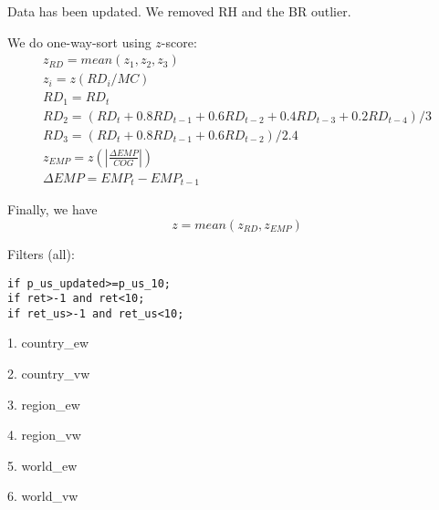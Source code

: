 

\usepackage[T1]{fontenc}




\thispagestyle{fancy}

\newcommand{\code}{\texttt}
\newcommand*{\Commonpath}{20190110/RD-COG}


Data has been updated. We removed RH and the BR outlier.



We do one-way-sort using $z$-score:
$$
\begin{aligned}
& z_{RD} = mean(z_1, z_2, z_3) \\
& z_i = z(RD_i/MC) \\
& RD_1 = RD_t \\
& RD_2 = (RD_t + 0.8RD_{t-1} + 0.6RD_{t-2} + 0.4RD_{t-3} + 0.2RD_{t-4})/3 \\
& RD_3 = (RD_t + 0.8RD_{t-1} + 0.6RD_{t-2})/2.4 
& \\
& z_{EMP} = z(|\frac{\Delta EMP}{COG}|) \\
& \Delta EMP = EMP_t - EMP_{t-1}
\end{aligned}
$$

Finally, we have
$$
z = mean(z_{RD}, z_{EMP})
$$


Filters (all):

\code{if p\_us\_updated>=p\_us\_10;} \\
\code{if ret>-1 and ret<10;} \\
\code{if ret\_us>-1 and ret\_us<10;} \\


\small

% 

% 
1. country\_ew


2. country\_vw


3. region\_ew


4. region\_vw


5. world\_ew


6. world\_vw



